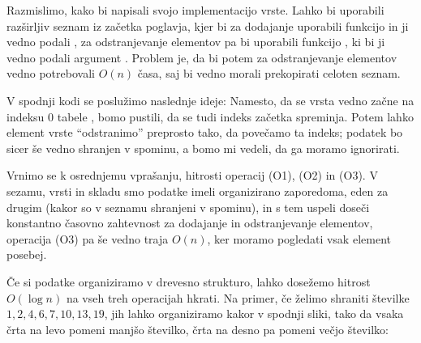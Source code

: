 
Razmislimo, kako bi napisali svojo implementacijo vrste.
Lahko bi uporabili razširljiv seznam iz začetka poglavja, kjer bi za dodajanje
uporabili funkcijo  in ji vedno podali
, za odstranjevanje elementov pa bi uporabili funkcijo
, ki bi ji vedno podali argument .
Problem je, da bi potem za odstranjevanje elementov vedno potrebovali $O(n)$
časa, saj bi vedno morali prekopirati celoten seznam.

V spodnji kodi se poslužimo naslednje ideje:
Namesto, da se vrsta vedno začne na indeksu $0$ tabele , bomo pustili,
da se tudi indeks začetka spreminja.
Potem lahko element vrste \enquote{odstranimo} preprosto tako, da povečamo ta
indeks; podatek bo sicer še vedno shranjen v spominu, a bomo mi vedeli, da ga
moramo ignorirati.



Vrnimo se k osrednjemu vprašanju, hitrosti operacij (O1), (O2) in (O3).
V sezamu, vrsti in skladu smo podatke imeli organizirano zaporedoma, eden za
drugim (kakor so v seznamu shranjeni v spominu), in s tem uspeli doseči
konstantno časovno zahtevnost za dodajanje in odstranjevanje elementov,
operacija (O3) pa še vedno traja $O(n)$, ker moramo pogledati vsak element
posebej.

Če si podatke organiziramo v drevesno strukturo, lahko dosežemo hitrost $O(\log
n)$ na vseh treh operacijah hkrati.
Na primer, če želimo shraniti številke $1, 2, 4, 6, 7, 10, 13, 19$, jih lahko
organiziramo kakor v spodnji sliki, tako da vsaka črta na levo pomeni manjšo
številko, črta na desno pa pomeni večjo številko:

\begin{figure*}[ht!]
  \centering
\end{figure*}

